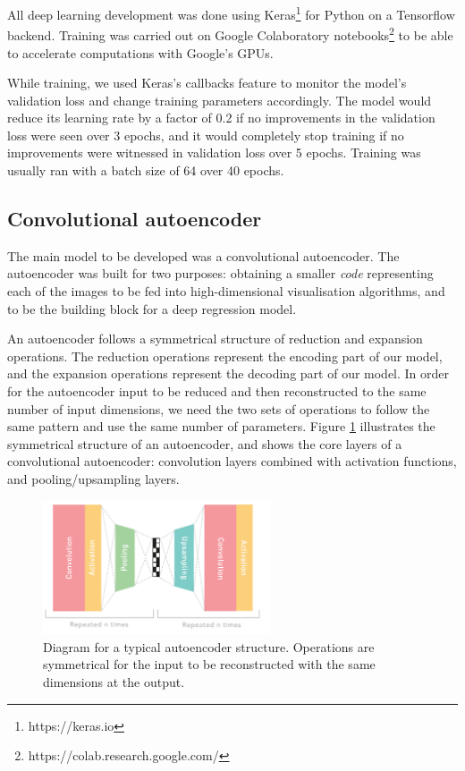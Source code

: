 All deep learning development was done using Keras\footnote{https://keras.io} for Python on a Tensorflow backend. Training was carried out on Google Colaboratory notebooks\footnote{https://colab.research.google.com/} to be able to accelerate computations with Google's GPUs.

While training, we used Keras's callbacks feature to monitor the model's validation loss and change training parameters accordingly. The model would reduce its learning rate by a factor of 0.2 if no improvements in the validation loss were seen over 3 epochs, and it would completely stop training if no improvements were witnessed in validation loss over 5 epochs. Training was usually ran with a batch size of 64 over 40 epochs.

\subsection{Convolutional autoencoder}

The main model to be developed was a convolutional autoencoder. The autoencoder was built for two purposes: obtaining a smaller \textit{code} representing each of the images to be fed into high-dimensional visualisation algorithms, and to be the building block for a deep regression model.

An autoencoder follows a symmetrical structure of reduction and expansion operations. The reduction operations represent the encoding part of our model, and the expansion operations represent the decoding part of our model. In order for the autoencoder input to be reduced and then reconstructed to the same number of input dimensions, we need the two sets of operations to follow the same pattern and use the same number of parameters. Figure \ref{fig:symmstruc} illustrates the symmetrical structure of an autoencoder, and shows the core layers of a convolutional autoencoder: convolution layers combined with activation functions, and pooling/upsampling layers.

\begin{figure}[h]
    \centering
    \includegraphics[width=0.6\textwidth]{dissertation/figures/autoencoder_repeat_structure.png}
    \caption{Diagram for a typical autoencoder structure. Operations are symmetrical for the input to be reconstructed with the same dimensions at the output.}
    \label{fig:symmstruc}
\end{figure}

